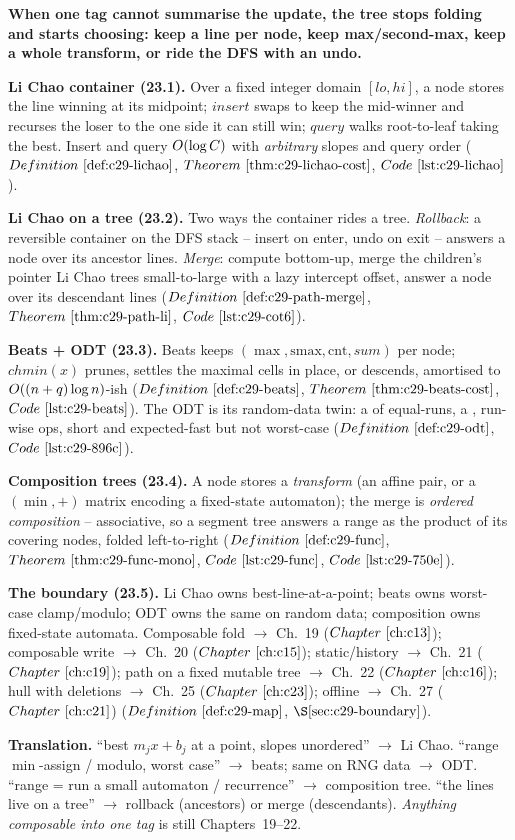 \begin{quickref}
\textbf{When one tag cannot summarise the update, the tree stops folding and starts choosing: keep a
line per node, keep max/second-max, keep a whole transform, or ride the DFS with an undo. }

\medskip
\textbf{Li Chao container (23.1).} Over a fixed integer domain \([lo,hi]\), a node stores the line
winning at its midpoint; \(\mathit{insert}\) swaps to keep the mid-winner and recurses the loser to
the one side it can still win; \(\mathit{query}\) walks root-to-leaf taking the best. Insert and
query \(O(\log C)\) with \emph{arbitrary} slopes and query order
(\(\defref{c29-lichao}\), \(\thmref{c29-lichao-cost}\), \(\coderef{c29-lichao}\)).

\medskip
\textbf{Li Chao on a tree (23.2).} Two ways the container rides a tree. \emph{Rollback}: a reversible
container on the DFS stack -- insert on enter, undo on exit -- answers a node over its ancestor lines.
\emph{Merge}: compute bottom-up, merge the children's pointer Li Chao trees small-to-large with a
lazy intercept offset, answer a node over its descendant lines
(\(\defref{c29-path-merge}\), \(\thmref{c29-path-li}\), \(\coderef{c29-cot6}\)).

\medskip
\textbf{Beats + ODT (23.3).} Beats keeps \((\max,\mathrm{smax},\mathrm{cnt},\mathit{sum})\) per node;
\(\mathit{chmin}(x)\) prunes, settles the maximal cells in place, or descends, amortised to
\(O((n+q)\log n)\)-ish (\(\defref{c29-beats}\), \(\thmref{c29-beats-cost}\), \(\coderef{c29-beats}\)).
The ODT is its random-data twin: a  of equal-runs, a , run-wise ops, short and
expected-fast but not worst-case (\(\defref{c29-odt}\), \(\coderef{c29-896c}\)).

\medskip
\textbf{Composition trees (23.4).} A node stores a \emph{transform} (an affine pair, or a
\((\min,+)\) matrix encoding a fixed-state automaton); the merge is \emph{ordered composition} --
associative, so a segment tree answers a range as the product of its covering nodes, folded
left-to-right (\(\defref{c29-func}\), \(\thmref{c29-func-mono}\), \(\coderef{c29-func}\),
\(\coderef{c29-750e}\)).

\medskip
\textbf{The boundary (23.5).} Li Chao owns best-line-at-a-point; beats owns worst-case clamp/modulo;
ODT owns the same on random data; composition owns fixed-state automata. Composable fold \(\to\)
Ch.~19 (\(\chref{c13}\)); composable write \(\to\) Ch.~20 (\(\chref{c15}\)); static/history \(\to\)
Ch.~21 (\(\chref{c19}\)); path on a fixed mutable tree \(\to\) Ch.~22 (\(\chref{c16}\)); hull with
deletions \(\to\) Ch.~25 (\(\chref{c23}\)); offline \(\to\) Ch.~27 (\(\chref{c21}\))
(\(\defref{c29-map}\), \(\secref{c29-boundary}\)).

\medskip
\textbf{Translation.} ``best \(m_j x + b_j\) at a point, slopes unordered'' \(\to\) Li Chao. ``range
\(\min\)-assign / modulo, worst case'' \(\to\) beats; same on RNG data \(\to\) ODT. ``range = run a
small automaton / recurrence'' \(\to\) composition tree. ``the lines live on a tree'' \(\to\) rollback
(ancestors) or merge (descendants). \emph{Anything composable into one tag} is still Chapters~19--22.
\end{quickref}

